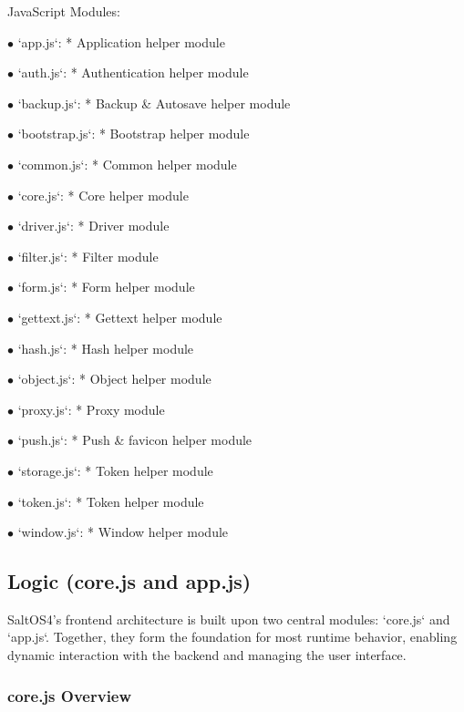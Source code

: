 \documentclass[a4paper]{article}
\begin{document}
JavaScript Modules:

\begin{compactitem}
\item[\color{myblue}$\bullet$] `app.js`: * Application helper module
\item[\color{myblue}$\bullet$] `auth.js`: * Authentication helper module
\item[\color{myblue}$\bullet$] `backup.js`: * Backup \& Autosave helper module
\item[\color{myblue}$\bullet$] `bootstrap.js`: * Bootstrap helper module
\item[\color{myblue}$\bullet$] `common.js`: * Common helper module
\item[\color{myblue}$\bullet$] `core.js`: * Core helper module
\item[\color{myblue}$\bullet$] `driver.js`: * Driver module
\item[\color{myblue}$\bullet$] `filter.js`: * Filter module
\item[\color{myblue}$\bullet$] `form.js`: * Form helper module
\item[\color{myblue}$\bullet$] `gettext.js`: * Gettext helper module
\item[\color{myblue}$\bullet$] `hash.js`: * Hash helper module
\item[\color{myblue}$\bullet$] `object.js`: * Object helper module
\item[\color{myblue}$\bullet$] `proxy.js`: * Proxy module
\item[\color{myblue}$\bullet$] `push.js`: * Push \& favicon helper module
\item[\color{myblue}$\bullet$] `storage.js`: * Token helper module
\item[\color{myblue}$\bullet$] `token.js`: * Token helper module
\item[\color{myblue}$\bullet$] `window.js`: * Window helper module
\end{compactitem}

\hypertarget{toc32}{}
\subsection{Logic (core.js and app.js)}

SaltOS4's frontend architecture is built upon two central modules: `core.js` and `app.js`. Together, they form the foundation for most runtime behavior, enabling dynamic interaction with the backend and managing the user interface.

\hypertarget{toc33}{}
\subsubsection{core.js Overview}
\end{document}

